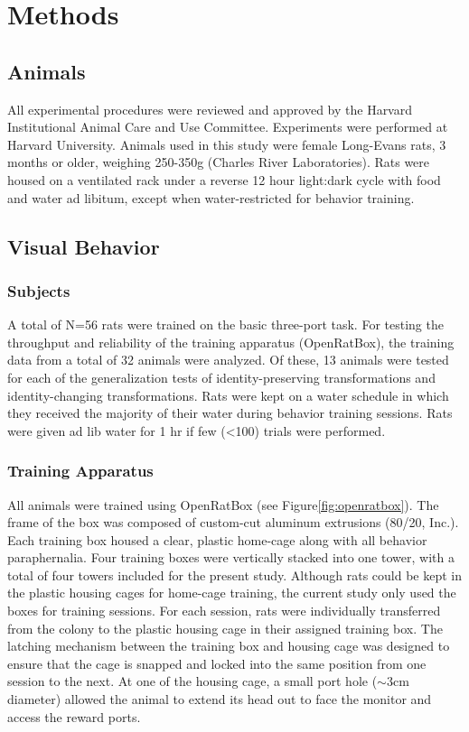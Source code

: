 \chapter{Methods}
\label{methods}

\section{Animals}
All experimental procedures were reviewed and approved by the Harvard Institutional Animal Care and Use Committee. Experiments were performed at Harvard University. Animals used in this study were female Long-Evans rats, 3 months or older, weighing 250-350g (Charles River Laboratories). Rats were housed on a ventilated rack under a reverse 12 hour light:dark cycle with food and water ad libitum, except when water-restricted for behavior training. 

\section{Visual Behavior}
\subsection{Subjects}
 A total of N=56 rats were trained on the basic three-port task. For testing the throughput and reliability of the training apparatus (OpenRatBox), the training data from a total of 32 animals were analyzed. Of these, 13 animals were tested for each of the generalization tests of identity-preserving transformations and identity-changing transformations. Rats were kept on a water schedule in which they received the majority of their water during behavior training sessions. Rats were given ad lib water for 1 hr if few (<100) trials were performed. 
 
\subsection{Training Apparatus}
All animals were trained using OpenRatBox (see Figure\ref{fig:openratbox}). The frame of the box was composed of custom-cut aluminum extrusions (80/20, Inc.). Each training box housed a clear, plastic home-cage along with all behavior paraphernalia. Four training boxes were vertically stacked into one tower, with a total of four towers included for the present study. Although rats could be kept in the plastic housing cages for home-cage training, the current study only used the boxes for training sessions. For each session, rats were individually transferred from the colony to the plastic housing cage in their assigned training box. The latching mechanism between the training box and housing cage was designed to ensure that the cage is snapped and locked into the same position from one session to the next. At one of the housing cage, a small port hole ($\sim$3cm diameter) allowed the animal to extend its head out to face the monitor and access the reward ports.

